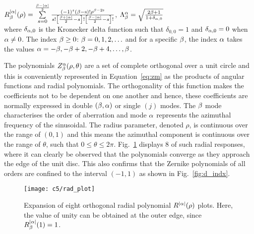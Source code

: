 $R_{\rm \beta}^{\lvert \rm \alpha \rvert}(\rho)  = \sum\limits_{s = 0}^{\frac{\rm \beta - \lvert \rm \alpha \rvert}{2}}  \frac{(-1)^{s}(\rm \beta-s)! \rho^{\rm \beta-2s}}{s!\left[\frac{\rm \beta + \lvert \rm \alpha \rvert}{2} -s\right]!\left[\frac{\rm \beta - \lvert \rm \alpha \rvert}{2} -s\right]!}$, \quad 
$\Lambda_{\rm \beta}^{\rm \alpha} = \sqrt{\frac{2\rm \beta+1}{1+\delta_{\rm \alpha,\rm 0}}}$ \\
 
\noindent where $\delta_{\rm \alpha,\rm 0}$ is the Kronecker delta function such that $\delta_{0,0} = 1$ and $\delta_{\rm \alpha,\rm 0} = 0$ when $\rm \alpha \neq 0$.  The index $\rm \beta \geq 0$: $\rm \beta = 0, 1, 2, \ldots $ and 
for a specific $\rm \beta$, the index $\rm \alpha$ takes the values $\rm \alpha = -\rm \beta, -\rm \beta + 2, -\rm \beta + 4,  \ldots , \rm \beta$.

\noindent The polynomials $Z_{\rm \beta}^{\rm \alpha}(\rho,\theta)$ are a set of complete orthogonal over a unit circle and this is conveniently represented in Equation~\ref{eq:zm} as the products of angular functions and radial polynomials. The orthogonality of this function makes the coefficients not to be dependent on one another \citep{charman2005wavefront,wyant1992basic} and hence, these coefficients are normally expressed in double $(\rm \beta, \rm \alpha)$ or single $(j)$ modes. The $\rm \beta$ mode characterises the order of aberration and mode $\rm \alpha$ represents the azimuthal frequency of the sinusoidal. The radius parameter, denoted $\rho$, is continuous over the range of $(0, 1)$ and this means the azimuthal component is continuous over the range of $\theta$, such that $ 0 \leq \theta \leq 2\pi $. Fig.~\ref{fig:rp} displays $8$ of such radial responses, where it can clearly be observed that the polynomials converge as they approach the edge of the unit disc. This also confirms that the Zernike polynomials of all orders are confined to the interval $(-1,1)$ as shown in Fig.~\ref{fig:d_indx}. 
%
% 

\begin{figure}
\begin{minipage}[H]{\linewidth}
      \centering
      \texttt{[image: c5/rad\_plot]} %
      \end{minipage}
    \caption{\label{fig:rp} Expansion of eight orthogonal radial polynomial $R_{}^{\lvert \rm \alpha \rvert}(\rho)$ plots. Here, the value of unity can be obtained at the
outer edge, since $R_{\rm \beta}^{\lvert \rm \alpha \rvert}(1) = 1$.}
\end{figure}
\FloatBarrier

